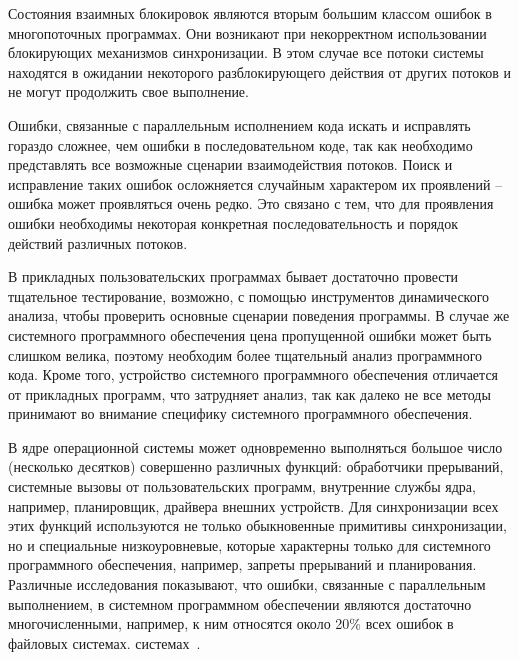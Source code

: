 Состояния взаимных блокировок являются вторым большим классом ошибок в многопоточных программах.
Они возникают при некорректном использовании блокирующих механизмов синхронизации.
В этом случае все потоки системы находятся в ожидании некоторого разблокирующего действия от других потоков и не могут продолжить свое выполнение. 

Ошибки, связанные с параллельным исполнением кода искать и исправлять гораздо сложнее, чем ошибки в последовательном коде, так как необходимо представлять все возможные сценарии взаимодействия потоков.
Поиск и исправление таких ошибок осложняется случайным характером их проявлений -- ошибка может проявляться очень редко.
Это связано с тем, что для проявления ошибки необходимы некоторая конкретная последовательность и порядок действий различных потоков. 

В прикладных пользовательских программах бывает достаточно провести тщательное тестирование, возможно, с помощью инструментов динамического анализа, чтобы проверить основные сценарии поведения программы.
В случае же системного программного обеспечения цена пропущенной ошибки может быть слишком велика, поэтому необходим более тщательный анализ программного кода.
Кроме того, устройство системного программного обеспечения отличается от прикладных программ, что затрудняет анализ, так как далеко не все методы принимают во внимание специфику системного программного обеспечения.

В ядре операционной системы может одновременно выполняться большое число (несколько десятков) совершенно различных функций: обработчики прерываний, системные вызовы от пользовательских программ, внутренние службы ядра, например, планировщик, драйвера внешних устройств.
Для синхронизации всех этих функций используются не только обыкновенные примитивы синхронизации, но и специальные низкоуровневые, которые характерны только для системного программного обеспечения, например, запреты прерываний и планирования. 
Различные исследования показывают, что ошибки, связанные с параллельным выполнением, в системном программном обеспечении являются достаточно многочисленными, например, к ним относятся около 20\% всех ошибок в файловых
\ifsynopsis
системах.
\else
системах~\cite{Palix11}.
\fi

